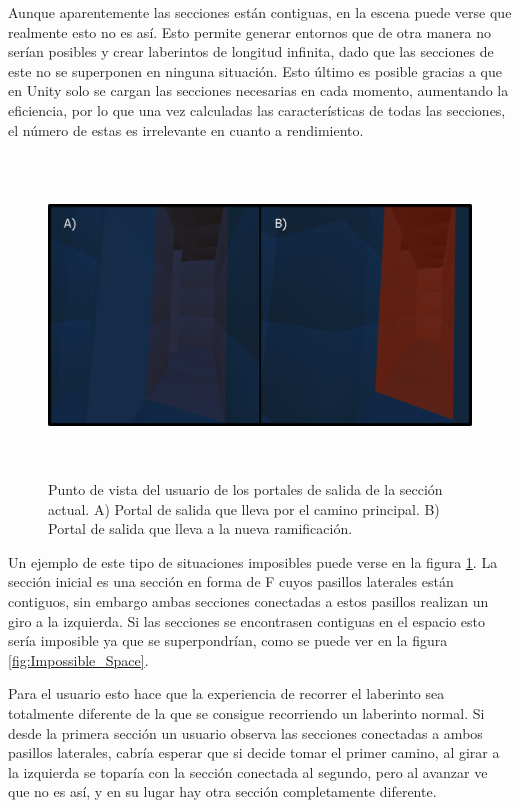 \documentclass[../main.tex]{subfiles}
\begin{document}
Aunque aparentemente las secciones están contiguas, en la escena puede verse que realmente esto no es así. Esto permite generar entornos que de otra manera no serían posibles y crear laberintos de longitud infinita, dado que las secciones de este no se superponen en ninguna situación. Esto último es posible gracias a que en Unity solo se cargan las secciones necesarias en cada momento, aumentando la eficiencia, por lo que una vez calculadas las características de todas las secciones, el número de estas es irrelevante en cuanto a rendimiento.

\begin{figure}[h!]
\hspace{-1cm}
\includegraphics[width=14cm,height=8.5cm]{imagenes/Both_Hallways.png}
\caption{Punto de vista del usuario de los portales de salida de la sección actual. A) Portal de salida que lleva por el camino principal. B) Portal de salida que lleva a la nueva ramificación.}
\label{fig:Both_Hallways}
\end{figure}

Un ejemplo de este tipo de situaciones imposibles puede verse en la figura \ref{fig:Both_Hallways}. La sección inicial es una sección en forma de F cuyos pasillos laterales están contiguos, sin embargo ambas secciones conectadas a estos pasillos realizan un giro a la izquierda. Si las secciones se encontrasen contiguas en el espacio esto sería imposible ya que se superpondrían, como se puede ver en la figura \ref{fig:Impossible_Space}.

Para el usuario esto hace que la experiencia de recorrer el laberinto sea totalmente diferente de la que se consigue recorriendo un laberinto normal. Si desde la primera sección un usuario observa las secciones conectadas a ambos pasillos laterales, cabría esperar que si decide tomar el primer camino, al girar a la izquierda se toparía con la sección conectada al segundo, pero al avanzar ve que no es así, y en su lugar hay otra sección completamente diferente.
\end{document}
